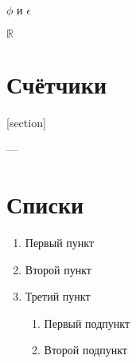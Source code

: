 \documentclass[12pt, a4paper]{article}
\theoremstyle{plain}              %
\theoremstyle{definition}         %
\begin{document}
$ \phi $ и $ \epsilon $


\renewcommand{\epsilon}{\ensuremath{\mathbb{R}}}

\epsilon


\section{Счётчики}


[section]

\setcounter{jtem}{13}











\thesection --- \thepage

\renewcommand{\thepage}{\roman{page}}

\renewcommand{\thesection}{\Asbuk{section}}
\setcounter{section}{0}






\section{Списки}

\begin{enumerate}
\item Первый пункт
\item Второй пункт
\item Третий пункт
\begin{enumerate}
\item Первый подпункт
\item Второй подпункт
\end{enumerate}
\end{enumerate}
\end{document}
